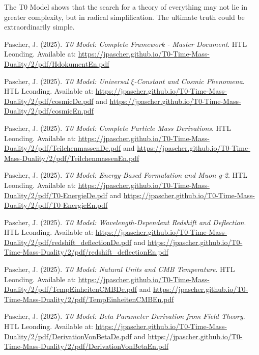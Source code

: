 \documentclass[12pt,a4paper]{report}
\begin{document}
	\begin{revolutionary}
		The T0 Model shows that the search for a theory of everything may not lie in greater complexity, but in radical simplification. The ultimate truth could be extraordinarily simple.
	\end{revolutionary}
	
	\begin{thebibliography}{99}
		Pascher, J. (2025). \textit{T0 Model: Complete Framework - Master Document}. HTL Leonding. Available at: \url{https://jpascher.github.io/T0-Time-Mass-Duality/2/pdf/HdokumentEn.pdf}
		
		Pascher, J. (2025). \textit{T0 Model: Universal $\xi$-Constant and Cosmic Phenomena}. HTL Leonding. Available at: \url{https://jpascher.github.io/T0-Time-Mass-Duality/2/pdf/cosmicDe.pdf} and \url{https://jpascher.github.io/T0-Time-Mass-Duality/2/pdf/cosmicEn.pdf}
		
		Pascher, J. (2025). \textit{T0 Model: Complete Particle Mass Derivations}. HTL Leonding. Available at: \url{https://jpascher.github.io/T0-Time-Mass-Duality/2/pdf/TeilchenmassenDe.pdf} and \url{https://jpascher.github.io/T0-Time-Mass-Duality/2/pdf/TeilchenmassenEn.pdf}
		
		Pascher, J. (2025). \textit{T0 Model: Energy-Based Formulation and Muon g-2}. HTL Leonding. Available at: \url{https://jpascher.github.io/T0-Time-Mass-Duality/2/pdf/T0-EnergieDe.pdf} and \url{https://jpascher.github.io/T0-Time-Mass-Duality/2/pdf/T0-EnergieEn.pdf}
		
		Pascher, J. (2025). \textit{T0 Model: Wavelength-Dependent Redshift and Deflection}. HTL Leonding. Available at: \url{https://jpascher.github.io/T0-Time-Mass-Duality/2/pdf/redshift_deflectionDe.pdf} and \url{https://jpascher.github.io/T0-Time-Mass-Duality/2/pdf/redshift_deflectionEn.pdf}
		
		Pascher, J. (2025). \textit{T0 Model: Natural Units and CMB Temperature}. HTL Leonding. Available at: \url{https://jpascher.github.io/T0-Time-Mass-Duality/2/pdf/TempEinheitenCMBDe.pdf} and \url{https://jpascher.github.io/T0-Time-Mass-Duality/2/pdf/TempEinheitenCMBEn.pdf}
		
		Pascher, J. (2025). \textit{T0 Model: Beta Parameter Derivation from Field Theory}. HTL Leonding. Available at: \url{https://jpascher.github.io/T0-Time-Mass-Duality/2/pdf/DerivationVonBetaDe.pdf} and \url{https://jpascher.github.io/T0-Time-Mass-Duality/2/pdf/DerivationVonBetaEn.pdf}
		

\end{thebibliography}
\end{document}
